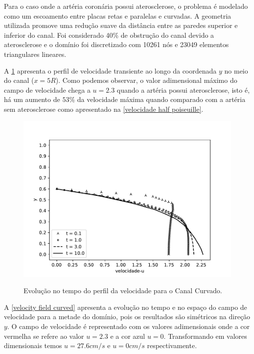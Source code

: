 Para o caso onde a artéria coronária possui aterosclerose,
o problema é modelado como um escoamento entre placas retas e paralelas
e curvadas. A geometria utilizada promove uma redução suave
da distância entre as paredes superior e inferior do canal.
Foi considerado 40\% de obstrução do canal devido a aterosclerose e
o domínio foi discretizado com 10261 nós e 23049 elementos triangulares lineares. \par
A \ref{velocity evolution curved} apresenta o perfil
de velocidade transiente ao longo da coordenada $y$ no
meio do canal ($x=5R$).
Como podemos observar, 
o valor adimensional máximo do campo de velocidade
chega a $u=2.3$ quando a artéria possui aterosclerose, isto é,
há um aumento de $53$\% da velocidade máxima quando comparado com
a artéria sem aterosclerose como apresentado na \ref{velocidade half poiseuille}.



\begin{figure}[H]
     \centering
     \includegraphics[scale=1]{./02_chaps/cap_solution/figure/vel_Curved_evol.pdf}\\
     \caption{Evolução no tempo do perfil da velocidade para o Canal Curvado.}
     \label{velocity evolution curved}
\end{figure}

\newpage
A \ref{velocity field curved} apresenta a evolução no tempo e no espaço
do campo de velocidade para a metade do domínio, pois os resultados são simétricos
na direção $y$. O campo de velocidade é representado com os valores adimensionais
onde a cor vermelha se refere ao valor $u=2.3$ e a cor azul $u=0$. Transformando em
valores dimensionais temos $u=27.6 cm/s$ e $u=0 cm/s$ respectivamente.

